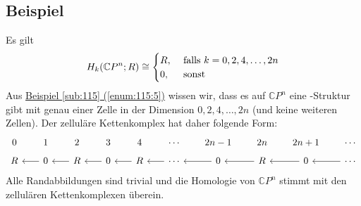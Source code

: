 \subsection[Beispiel: Homologie von $\mathds{C}P^n$]{Beispiel} %
\label{sub:1212}
Es gilt 
\[
	H_k \enbrace*{\mathds{C}P^n;R} \cong  \begin{cases}
		R, &\text{ falls }k=0,2,4,\ldots ,2n\\
		0 ,&\text{ sonst}
	\end{cases}
\]
Aus \hyperref[enum:115:5]{Beispiel \ref*{sub:115} (\ref*{enum:115:5})} wissen wir, dass es auf $\mathds{C}P^n$ eine \CW-Struktur gibt mit genau einer Zelle in der Dimension $0,2,4, \ldots ,2n$ (und keine weiteren 
Zellen). Der zelluläre Kettenkomplex hat daher folgende Form:
\[
	\begin{tikzcd}[row sep=tiny, column sep=scriptsize]
		0 & 1 & 2 & 3 & 4 & \cdots & 2n-1 & 2n & 2n +1 & \cdots \\
		R & 0 \lar & R \lar& 0 \lar & R \lar & \cdots \lar & 0 \lar& R \lar & 0 \lar & \cdots \lar
	\end{tikzcd}
\]
Alle Randabbildungen sind trivial und die Homologie von $\mathds{C}P^n$ stimmt mit den zellulären Kettenkomplexen überein. \bewende

